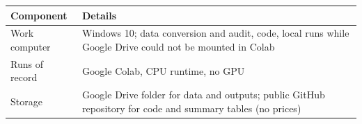 \begin{tabular}{lp{9cm}}
\toprule
\textbf{Component} & \textbf{Details} \\
\midrule
Work computer & Windows 10; data conversion and audit, code, local runs while Google Drive could not be mounted in Colab \\
Runs of record & Google Colab, CPU runtime, no GPU \\
Storage & Google Drive folder for data and outputs; public GitHub repository for code and summary tables (no prices) \\
\bottomrule
\end{tabular}
